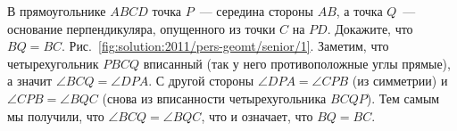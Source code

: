 \problem
В прямоугольнике $ABCD$ точка $P$~--- середина стороны $AB$, а точка
$Q$~--- основание перпендикуляра, опущенного из точки $C$ на $PD$.
Докажите, что $BQ = BC$.
%
\label{solution:2011/pers-geomt/senior/1}%
Рис.~\ref{fig:solution:2011/pers-geomt/senior/1}.
Заметим, что четырехугольник $PBCQ$ вписанный
(так у него противоположные углы прямые),
а значит $\angle BCQ = \angle DPA$.
С другой стороны $\angle DPA = \angle CPB$ (из симметрии) и
$\angle CPB = \angle BQC$ (снова из вписанности четырехугольника $BCQP$).
Тем самым мы получили, что $\angle BCQ = \angle BQC$, что и означает, что
$BQ = BC$.
\endproblem
